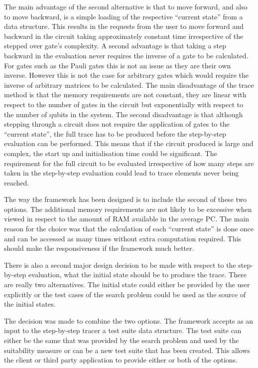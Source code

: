 The main advantage of the second alternative is that to move forward, and also to move backward, is a simple loading of the respective ``current state'' from a data structure.
This results in the requests from the user to move forward and backward in the circuit taking approximately constant time irrespective of the stepped over gate's complexity.
A second advantage is that taking a step backward in the evaluation never requires the inverse of a gate to be calculated.
For gates such as the Pauli gates this is not an issue as they are their own inverse.
However this is not the case for arbitrary gates which would require the inverse of arbitrary matrices to be calculated.
The main disadvantage of the trace method is that the memory requirements are not constant, they are linear with respect to the number of gates in the circuit but exponentially with respect to the number of qubits in the system.
The second disadvantage is that although stepping through a circuit does not require the application of gates to the ``current state'', the full trace has to be produced before the step-by-step evaluation can be performed.
This means that if the circuit produced is large and complex, the start up and initialisation time could be significant.
The requirement for the full circuit to be evaluated irrespective of how many steps are taken in the step-by-step evaluation could lead to trace elements never being reached.

The way the framework has been designed is to include the second of these two options.
The additional memory requirements are not likely to be excessive when viewed in respect to the amount of RAM available in the average PC.
The main reason for the choice was that the calculation of each ``current state'' is done once and can be accessed as many times without extra computation required.
This should make the responsiveness if the framework much better.

There is also a second major design decision to be made with respect to the step-by-step evaluation, what the initial state should be to produce the trace.
There are really two alternatives.
The initial state could either be provided by the user explicitly or the test cases of the search problem could be used as the source of the initial  states.

The decision was made to combine the two options.
The framework accepts as an input to the step-by-step tracer a test suite data structure.
The test suite can either be the same that was provided by the search problem and used by the suitability measure or can be a new test suite that has been created.
This allows the client or third party application to provide either or both of the options.

